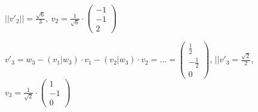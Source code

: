 \documentclass[a4paper, openany]{book}
\begin{document}
\begin{enumerate}[label=(\alph*)]
          \par \medskip

          $||v'_2|| = \frac{\sqrt{6}}{3}, \ v_2 = \frac{1}{\sqrt{6}} \cdot \begin{pmatrix}-1 \\ -1 \\ 2 \end{pmatrix}$

          \par \medskip

          $v'_3 = w_3 - (v_1|w_3) \cdot v_1 - (v_2 | w_3) \cdot v_2 = ... = \begin{pmatrix}\frac{1}{2} \\ - \frac{1}{2} \\ 0 \end{pmatrix}$, $||v'_3 = \frac{\sqrt{2}}{2}$, $v_3 = \frac{1}{\sqrt{2}} \cdot \begin{pmatrix}1 \\ -1 \\ 0 \end{pmatrix}$
        \end{enumerate}

        
\end{document}
